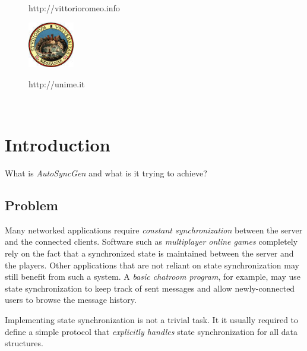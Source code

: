 \documentclass{report}
\begin{document}
\begin{titlepage}
\begin{minipage}{\linewidth}
\begin{minipage}{0.35\linewidth}
\begin{figure}[H]
                    http://vittorioromeo.info
                \end{figure}
            \end{minipage}
            \hspace{0.27\linewidth}
            \begin{minipage}{0.35\linewidth}
                \begin{figure}[H]
                    \center
                    \includegraphics[width=2cm, height=2cm]{logounime}
                    
                    http://unime.it
                \end{figure}
            \end{minipage}
        \end{minipage}\\[3cm]
    \end{titlepage}


    \tableofcontents
    \newpage
    
    \chapter{Introduction}
        What is \emph{AutoSyncGen} and what is it trying to achieve?
    
        \section{Problem}
            Many networked applications require \emph{constant synchronization} between the server and the connected clients. 
            Software such as \emph{multiplayer online games} completely rely on the fact that a synchronized state is maintained between the server and the players.
            Other applications that are not reliant on state synchronization may still benefit from such a system. 
            A \emph{basic chatroom program}, for example, may use state synchronization to keep track of sent messages and allow newly-connected users to browse the message history.

            Implementing state synchronization is not a trivial task. It it usually required to define a simple protocol that \emph{explicitly handles} state synchronization for all data structures. 
\end{document}
